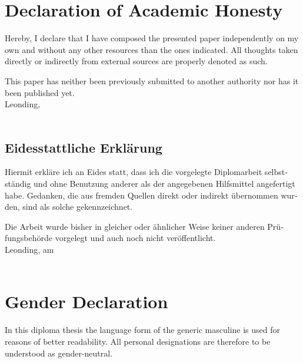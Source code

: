 \section*{Declaration of Academic Honesty} %
Hereby, I declare that I have composed the presented paper independently on my own and without any other resources than the ones indicated. All thoughts taken directly or indirectly from external sources are properly denoted as such.

This paper has neither been previously submitted to another authority nor has it been published yet. \\[1em]
Leonding, \duedateen \\[5em]
\ifthenelse{\isundefined{\firstauthor}}{}{\firstauthor}
\ifthenelse{\isundefined{\secondauthor}}{}{\kern-1ex, \secondauthor}
\ifthenelse{\isundefined{\thirdauthor}}{}{\kern-1ex, \thirdauthor}
\ifthenelse{\isundefined{\fourthauthor}}{}{\kern-1ex, \fourthauthor} \\[5em]

\begin{otherlanguage}{german}
\section*{Eidesstattliche Erklärung}
Hiermit erkläre ich an Eides statt, dass ich die vorgelegte Diplomarbeit selbstständig und ohne Benutzung anderer als der angegebenen Hilfsmittel angefertigt habe. Gedanken, die aus fremden Quellen direkt oder indirekt übernommen wurden, sind als solche gekennzeichnet.

Die Arbeit wurde bisher in gleicher oder ähnlicher Weise keiner anderen Prüfungsbehörde vorgelegt und auch noch nicht veröffentlicht. \\[1em]
Leonding, am \duedatede \\[5em]
\ifthenelse{\isundefined{\firstauthor}}{}{\firstauthor}
\ifthenelse{\isundefined{\secondauthor}}{}{\kern-1ex, \secondauthor}
\ifthenelse{\isundefined{\thirdauthor}}{}{\kern-1ex, \thirdauthor}
\ifthenelse{\isundefined{\fourthauthor}}{}{\kern-1ex, \fourthauthor} \\[5em]
\end{otherlanguage}

\section*{Gender Declaration} %
In this diploma thesis the language form of the generic masculine is used for reasons of better readability. All personal designations are therefore to be understood as gender-neutral.

